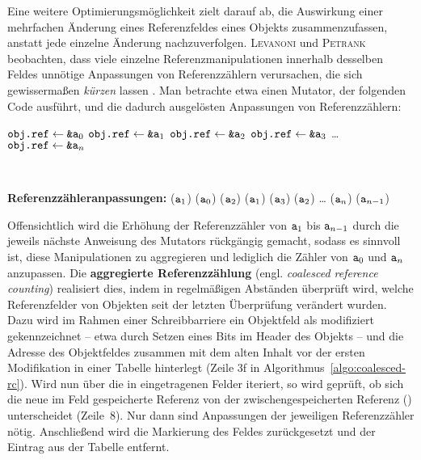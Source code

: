 Eine weitere Optimierungsmöglichkeit zielt darauf ab, die Auswirkung einer mehrfachen Änderung eines Referenzfeldes eines Objekts zusammenzufassen, anstatt jede einzelne Änderung nachzuverfolgen.
\textsc{Levanoni} und \textsc{Petrank} beobachten, dass viele einzelne Referenzmanipulationen innerhalb desselben Feldes unnötige Anpassungen von Referenzzählern verursachen, die sich gewissermaßen \textit{kürzen} lassen \cite[S. 4ff]{levanoni2006}.
Man betrachte etwa einen Mutator, der folgenden Code ausführt, und die dadurch ausgelösten Anpassungen von Referenzzählern:

\begin{center}
\begin{minipage}{0.3\textwidth}
	\centering
	\begin{algorithmic}[1]
		\Statex $\texttt{obj.ref} \gets \texttt{\&a}_0$
		\Statex $\texttt{obj.ref} \gets \texttt{\&a}_1$
		\Statex $\texttt{obj.ref} \gets \texttt{\&a}_2$
		\Statex $\texttt{obj.ref} \gets \texttt{\&a}_3$
		\Statex \dots
		\Statex $\texttt{obj.ref} \gets \texttt{\&a}_n$
	\end{algorithmic}
\end{minipage}~
\begin{minipage}{0.6\textwidth}
	\centering
	\begin{algorithmic}[1]
		\Statex \textbf{Referenzzähleranpassungen:}
		\Statex {}($\texttt{a}_1$) \quad {}($\texttt{a}_0$)
		\Statex {}($\texttt{a}_2$) \quad {}($\texttt{a}_1$)
		\Statex {}($\texttt{a}_3$) \quad {}($\texttt{a}_2$)
		\Statex \dots
		\Statex {}($\texttt{a}_n$) \quad {}($\texttt{a}_{n-1}$)
	\end{algorithmic}
\end{minipage}
\end{center}

Offensichtlich wird die Erhöhung der Referenzzähler von $\texttt{a}_1$ bis $\texttt{a}_{n-1}$ durch die jeweils nächste Anweisung des Mutators rückgängig gemacht, sodass es sinnvoll ist, diese Manipulationen zu aggregieren und lediglich die Zähler von $\texttt{a}_0$ und $\texttt{a}_n$ anzupassen.
Die \textbf{aggregierte Referenzzählung} (engl. \textit{coalesced reference counting}) realisiert dies, indem in regelmäßigen Abständen überprüft wird, welche Referenzfelder von Objekten seit der letzten Überprüfung verändert wurden.
Dazu wird im Rahmen einer Schreibbarriere ein Objektfeld als modifiziert gekennzeichnet -- etwa durch Setzen eines Bits im Header des Objekts -- und die Adresse des Objektfeldes zusammen mit dem alten Inhalt vor der ersten Modifikation in einer Tabelle  hinterlegt (Zeile 3f in Algorithmus~\ref{algo:coalesced-rc}).
Wird nun über die in  eingetragenen Felder iteriert, so wird geprüft, ob sich die neue im Feld gespeicherte Referenz  von der zwischengespeicherten Referenz () unterscheidet (Zeile~8).
Nur dann sind Anpassungen der jeweiligen Referenzzähler nötig.
Anschließend wird die Markierung des Feldes zurückgesetzt und der Eintrag aus der Tabelle entfernt.

